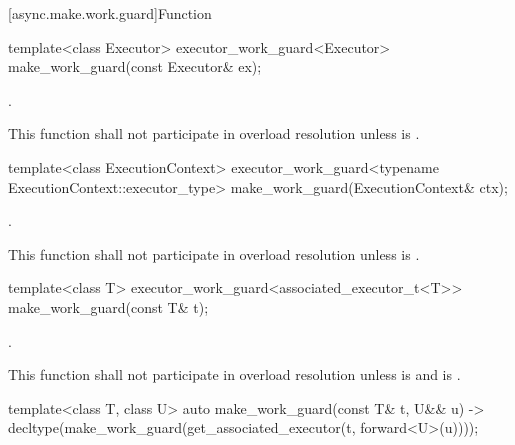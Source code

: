 [async.make.work.guard]{Function }

%
\begin{itemdecl}
template<class Executor>
  executor_work_guard<Executor>
    make_work_guard(const Executor& ex);
\end{itemdecl}

\begin{itemdescr}
\pnum
\returns {}.

\pnum
\remarks This function shall not participate in overload resolution unless
 is .
\end{itemdescr}

%
\begin{itemdecl}
template<class ExecutionContext>
  executor_work_guard<typename ExecutionContext::executor_type>
    make_work_guard(ExecutionContext& ctx);
\end{itemdecl}

\begin{itemdescr}
\pnum
\returns {}.

\pnum
\remarks This function shall not participate in overload resolution
unless  is .
\end{itemdescr}

%
\begin{itemdecl}
template<class T>
  executor_work_guard<associated_executor_t<T>>
    make_work_guard(const T& t);
\end{itemdecl}

\begin{itemdescr}
\pnum
\returns {}.

\pnum
\remarks This function shall not participate in overload resolution unless
 is 
and  is .
\end{itemdescr}

%
\begin{itemdecl}
template<class T, class U>
  auto make_work_guard(const T& t, U&& u)
    -> decltype(make_work_guard(get_associated_executor(t, forward<U>(u))));
\end{itemdecl}

